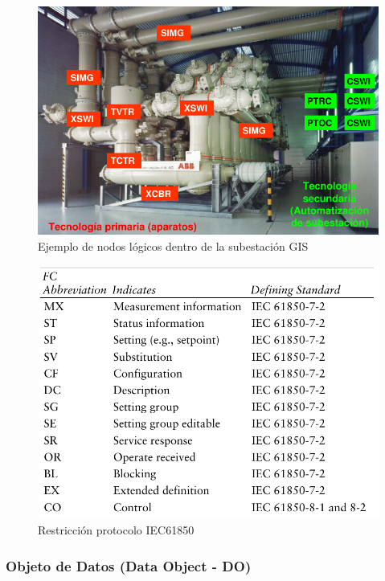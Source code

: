 \documentclass[a5paper]{book}%
\begin{document}
\begin{figure}[H]
  \centering
  \caption{Ejemplo de nodos lógicos dentro de la subestación GIS }
  \label{fig:ln_example}
  \includegraphics[width=\linewidth]{ln_example}
\end{figure}


  
  \begin{figure}[H]
  \centering
  \caption{Restricción protocolo IEC61850}
  \label{fig:iec61850resticcion}
  \includegraphics[width=\linewidth]{restricciones}
\end{figure}



\subsubsection{Objeto de Datos (Data Object - DO)}
\end{document}
